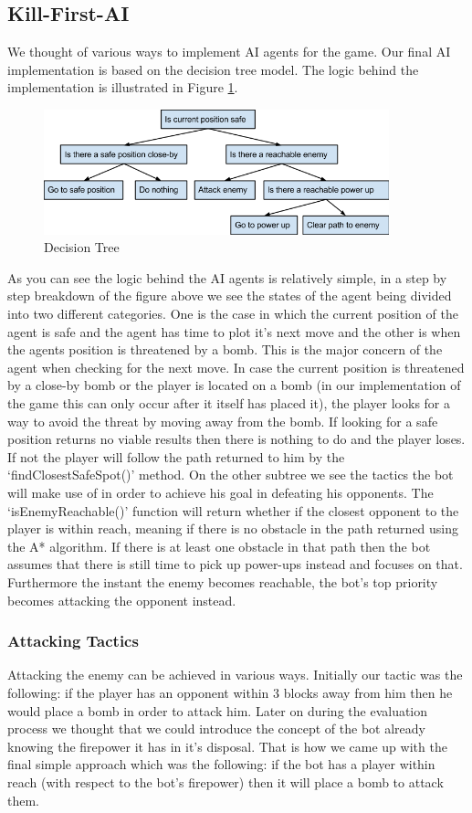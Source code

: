 \subsection{Kill-First-AI}
We thought of various ways to implement AI agents for the game. Our final AI implementation is based on the decision tree model. The logic behind the implementation is illustrated in Figure \ref{fig:tree1}.

\begin{figure}
\centering
\includegraphics[width=10cm]{resources/tree1}
\caption{Decision Tree}
\label{fig:tree1}
\end{figure}

As you can see the logic behind the AI agents is relatively simple, in a step by step breakdown of the figure above we see the states of the agent being divided into two different categories. One is the case in which the current position of the agent is safe and the agent has time to plot it’s  next move and the other is when the agents position is threatened by a bomb. This is the major concern of the agent when checking for the next move. 
In case the current position is threatened by a close-by bomb or the player is located on a bomb (in our implementation of the game this can only occur after it itself has placed it), the player looks for a way to avoid the threat by moving away from the bomb. If looking for a safe position returns no viable results then there is nothing to do and the player loses. If not the player will follow the path returned to him by the ‘findClosestSafeSpot()’ method.
On the other subtree we see the tactics the bot will make use of in order to achieve his goal in defeating his opponents. The ‘isEnemyReachable()’ function will return whether if the closest opponent to the player is within reach, meaning if there is no obstacle in the path returned using the A* algorithm. If there is at least one obstacle in that path then the bot assumes that there is still time to pick up power-ups instead and focuses on that. Furthermore the instant the enemy becomes reachable, the bot’s top priority becomes attacking the opponent instead.


\subsubsection{Attacking Tactics}
Attacking the enemy can be achieved in various ways. Initially our tactic was the following: if the player has an opponent within 3 blocks away from him then he would place a bomb in order to attack him. Later on during the evaluation process we thought that we could introduce the concept of the bot already knowing the firepower it has in it’s disposal. That is how we came up with the final simple approach which was the following: if the bot has a player within reach (with respect to the bot’s firepower) then it will place a bomb to attack them.


